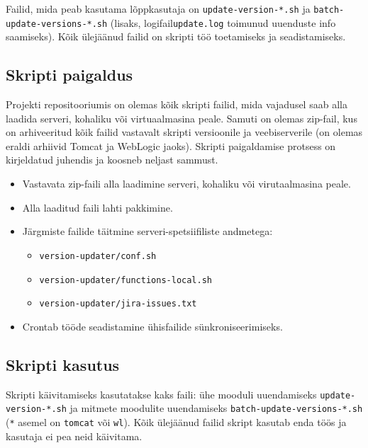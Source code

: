\documentclass[12pt]{report}
\newcommand{\code}[1]{\texttt{#1}}
\begin{document}
   Failid, mida peab kasutama lõppkasutaja on \code{update-version-*.sh} ja \code{batch-update-versions-*.sh} (lisaks, logifail\code{update.log} toimunud uuenduste info saamiseks). Kõik ülejäänud failid on skripti töö toetamiseks ja seadistamiseks.\\
   
   \newpage
      
 \subsection{Skripti paigaldus}
  
  Projekti repositooriumis on olemas kõik skripti failid, mida vajadusel saab alla laadida serveri, kohaliku või virtuaalmasina peale. Samuti on olemas zip\--fail, kus on arhiveeritud kõik failid vastavalt skripti versioonile ja veebiserverile (on olemas eraldi arhiivid Tomcat ja WebLogic jaoks). Skripti paigaldamise protsess on kirjeldatud juhendis ja koosneb neljast sammust.
  \begin{itemize}
    \item Vastavata zip\--faili alla laadimine serveri, kohaliku või virutaalmasina peale.
    \item Alla laaditud faili lahti pakkimine.
    \item Järgmiste failide täitmine serveri\--spetsiifiliste andmetega:
    \begin{itemize}
      \item \code{version-updater/conf.sh}
      \item \code{version-updater/functions-local.sh}
      \item \code{version-updater/jira-issues.txt}
    \end{itemize}
    \item Crontab tööde seadistamine ühisfailide sünkroniseerimiseks.
  \end{itemize}
  
  \subsection{Skripti kasutus} 
   
  Skripti käivitamiseks kasutatakse kaks faili: ühe mooduli uuendamiseks \code{update-version-*.sh} ja mitmete moodulite uuendamiseks \code{batch-update-versions-*.sh} (\code{*} asemel on \code{tomcat} või \code{wl}). Kõik ülejäänud failid skript kasutab enda töös ja kasutaja ei pea neid käivitama.\\
  
\end{document}
